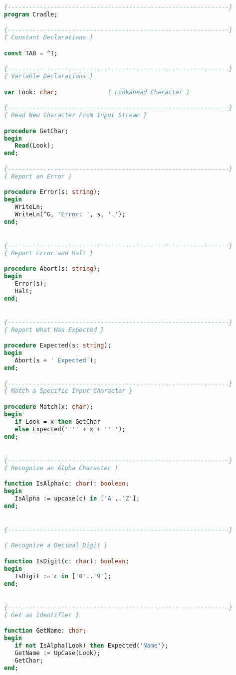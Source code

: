 \documentclass[float=false, crop=false]{standalone}
\begin{document}
\begin{lstlisting}[language=Pascal]
{--------------------------------------------------------------}
program Cradle;

{--------------------------------------------------------------}
{ Constant Declarations }

const TAB = ^I;

{--------------------------------------------------------------}
{ Variable Declarations }

var Look: char;              { Lookahead Character }

{--------------------------------------------------------------}
{ Read New Character From Input Stream }

procedure GetChar;
begin
   Read(Look);
end;

{--------------------------------------------------------------}
{ Report an Error }

procedure Error(s: string);
begin
   WriteLn;
   WriteLn(^G, 'Error: ', s, '.');
end;


{--------------------------------------------------------------}
{ Report Error and Halt }

procedure Abort(s: string);
begin
   Error(s);
   Halt;
end;


{--------------------------------------------------------------}
{ Report What Was Expected }

procedure Expected(s: string);
begin
   Abort(s + ' Expected');
end;

{--------------------------------------------------------------}
{ Match a Specific Input Character }

procedure Match(x: char);
begin
   if Look = x then GetChar
   else Expected('''' + x + '''');
end;


{--------------------------------------------------------------}
{ Recognize an Alpha Character }

function IsAlpha(c: char): boolean;
begin
   IsAlpha := upcase(c) in ['A'..'Z'];
end;


{--------------------------------------------------------------}

{ Recognize a Decimal Digit }

function IsDigit(c: char): boolean;
begin
   IsDigit := c in ['0'..'9'];
end;


{--------------------------------------------------------------}
{ Get an Identifier }

function GetName: char;
begin
   if not IsAlpha(Look) then Expected('Name');
   GetName := UpCase(Look);
   GetChar;
end;



\end{lstlisting}
\end{document}
